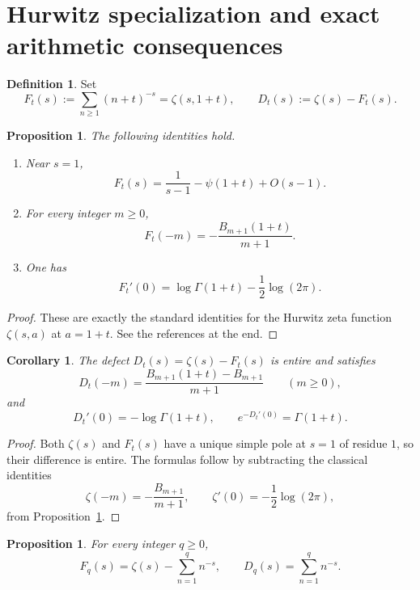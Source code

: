 \documentclass[11pt]{amsart}
\numberwithin{equation}{section}
\newtheorem{proposition}[theorem]{Proposition}
\newtheorem{corollary}[theorem]{Corollary}
\theoremstyle{definition}
\newtheorem{definition}[theorem]{Definition}
\begin{document}
\section{Hurwitz specialization and exact arithmetic consequences}

\begin{definition}\label{def:hurwitz-specialization}
Set
\[
F_t(s):=\sum_{n\ge1}(n+t)^{-s}=\zeta(s,1+t),
\qquad
D_t(s):=\zeta(s)-F_t(s).
\]
\end{definition}

\begin{proposition}\label{prop:hurwitz-standard-package}
The following identities hold.
\begin{enumerate}[label=(\arabic*)]
    \item Near $s=1$,
    \[
    F_t(s)=\frac1{s-1}-\psi(1+t)+O(s-1).
    \]
    \item For every integer $m\ge0$,
    \[
    F_t(-m)=-\frac{B_{m+1}(1+t)}{m+1}.
    \]
    \item One has
    \[
    F_t'(0)=\log\Gamma(1+t)-\frac12\log(2\pi).
    \]
\end{enumerate}
\end{proposition}

\begin{proof}
These are exactly the standard identities for the Hurwitz zeta function $\zeta(s,a)$ at $a=1+t$. See the references at the end. 
\end{proof}

\begin{corollary}\label{cor:defect-entire-bernoulli-gamma}
The defect $D_t(s)=\zeta(s)-F_t(s)$ is entire and satisfies
\[
D_t(-m)=\frac{B_{m+1}(1+t)-B_{m+1}}{m+1}
\qquad(m\ge0),
\]
and
\[
D_t'(0)=-\log\Gamma(1+t),
\qquad
e^{-D_t'(0)}=\Gamma(1+t).
\]
\end{corollary}

\begin{proof}
Both $\zeta(s)$ and $F_t(s)$ have a unique simple pole at $s=1$ of residue $1$, so their difference is entire. The formulas follow by subtracting the classical identities
\[
\zeta(-m)=-\frac{B_{m+1}}{m+1},
\qquad
\zeta'(0)=-\frac12\log(2\pi),
\]
from Proposition~\ref{prop:hurwitz-standard-package}. 
\end{proof}

\begin{proposition}\label{prop:integer-shift-coefficient-surgery}
For every integer $q\ge0$,
\[
F_q(s)=\zeta(s)-\sum_{n=1}^{q}n^{-s},
\qquad
D_q(s)=\sum_{n=1}^{q}n^{-s}.
\]
\end{proposition}
\end{document}
